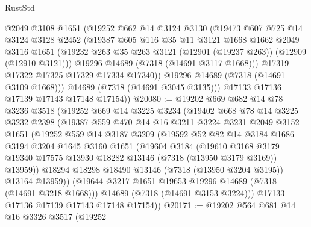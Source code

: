 \begin{lexlean}{RustStd}
\begin{coremodule}
            @2049
            @3108
            @1651
            (@19252
              @662
              @14
              @3124
              @3130
              (@19473
                @607
                @725
                @14
                @3124
                @3128
                @2452
                (@19387
                  @605
                  @116
                  @35
                  @11
                  @3121
                  @1668
                  @1662
                  @2049
                  @3116
                  @1651
                  (@19232 @263 @35 @263 @3121 (@12901 (@19237 @263)) (@12909 (@12910 @3121)))
                  @19296
                  @14689
                  (@7318 (@14691 @3117 @1668)))
                @17319
                @17322
                @17325
                @17329
                @17334
                @17340))
            @19296
            @14689
            (@7318 (@14691 @3109 @1668)))
          @14689
          (@7318 (@14691 @3045 @3135)))
        @17133
        @17136
        @17139
        @17143
        @17148
        @17154))
@20080 := @19202
    @669
    @682
    @14
    @78
    @3236
    @3518
    (@19252
      @669
      @14
      @3225
      @3234
      (@19402
        @668
        @78
        @14
        @3225
        @3232
        @2398
        (@19387
          @559
          @470
          @14
          @16
          @3211
          @3224
          @3231
          @2049
          @3152
          @1651
          (@19252
            @559
            @14
            @3187
            @3209
            (@19592
              @52
              @82
              @14
              @3184
              @1686
              @3194
              @3204
              @1645
              @3160
              @1651
              (@19604
                @3184
                (@19610
                  @3168
                  @3179
                  @19340
                  @17575
                  @13930
                  @18282
                  @13146
                  (@7318 (@13950 @3179 @3169))
                  @13959))
              @18294
              @18298
              @18490
              @13146
              (@7318 (@13950 @3204 @3195))
              @13164
              @13959))
          (@19644 @3217 @1651 @19653 @19296 @14689 (@7318 (@14691 @3218 @1668)))
          @14689
          (@7318 (@14691 @3153 @3224)))
        @17133
        @17136
        @17139
        @17143
        @17148
        @17154))
@20171 := @19202
    @564
    @681
    @14
    @16
    @3326
    @3517
    (@19252

\end{coremodule}
\end{lexlean}
